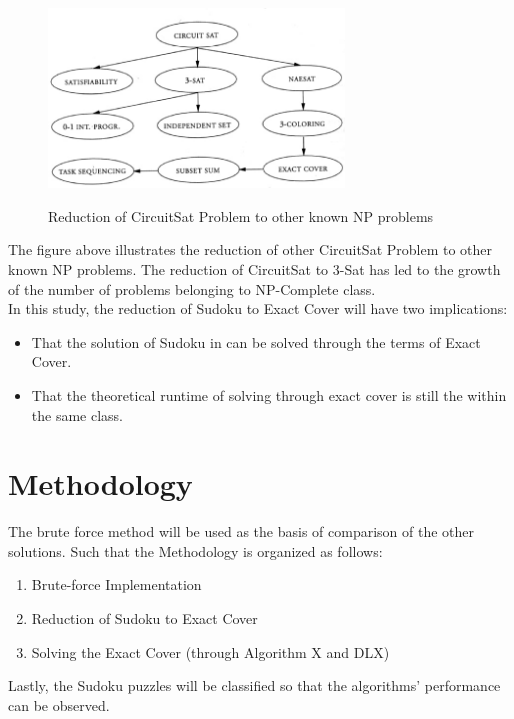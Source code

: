 \documentclass[a4paper,oneside,11pt]{report}
\begin{document}
\begin{figure}
  \centering
  {\includegraphics[width=0.7\textwidth]{circuitsat.jpg}}
  \caption{Reduction of CircuitSat Problem to other known NP problems}
\end{figure}
The figure above illustrates the reduction of other CircuitSat Problem to other known NP problems. The reduction of CircuitSat to 3-Sat has led to the growth of the number of problems belonging to NP-Complete class.\\

\noindent In this study, the reduction of Sudoku to Exact Cover will have two implications:
\begin{itemize}
\item That the solution of Sudoku in can be solved through the terms of Exact Cover.
\item That the theoretical runtime of solving through exact cover is still the within the same class.
\end{itemize}

\chapter{Methodology}
The brute force method will be used as the basis of comparison of the other solutions. Such that the Methodology is organized as follows:
\begin{enumerate}
\item Brute-force Implementation
\vspace{-0.5cm}
\item Reduction of Sudoku to Exact Cover
\vspace{-0.5cm}
\item Solving the Exact Cover (through Algorithm X and DLX)
\end{enumerate}
Lastly, the Sudoku puzzles will be classified so that the algorithms’ performance can be observed.\\
\end{document}
